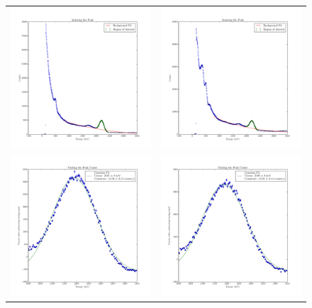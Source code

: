 \documentclass{article}
\begin{document}
  \begin{figure}[!htb]
    \centering
    \begin{tabular}{c c}
      \includegraphics[width=.5\linewidth]{../plots/peak_isolation_nolead_portclosed.pdf} & \includegraphics[width=.5\linewidth]{../plots/peak_isolation_nolead_portopen.pdf} \\
      \includegraphics[width=.5\linewidth]{../plots/peak_center_nolead_portclosed.pdf} & \includegraphics[width=.5\linewidth]{../plots/peak_center_nolead_portopen.pdf} \\

\end{tabular}
\end{figure}
\end{document}
